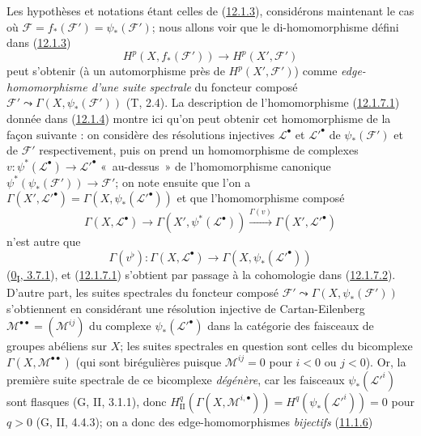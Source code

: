\begin{env}[12.1.7]
\label{0.12.1.7-fr}
Les hypothèses et notations étant celles de
(\hyperref[0.12.1.3-fr]{12.1.3}), considérons maintenant le cas où
$\mathcal F=f_*(\mathcal F')=\psi_*(\mathcal F')$; nous allons voir que le
di-homomorphisme défini dans (\hyperref[0.12.1.3-fr]{12.1.3})
\[
\label{0.12.1.7.1-fr}
\tag{12.1.7.1}
H^p(X,f_*(\mathcal F'))\longrightarrow H^p(X',\mathcal F')
\]
peut s'obtenir (à un automorphisme près de $H^p(X',\mathcal F')$) comme
\emph{edge-homomorphisme d'une suite spectrale} du foncteur composé
$\mathcal F'\leadsto\Gamma(X,\psi_*(\mathcal F'))$ (T, 2.4). La description
de l'homomorphisme (\hyperref[0.12.1.7.1-fr]{12.1.7.1}) donnée dans
(\hyperref[0.12.1.4-fr]{12.1.4}) montre ici qu'on peut obtenir cet
homomorphisme de la façon suivante : on considère des résolutions injectives
$\mathcal L^\bullet$ et $\mathcal L'^\bullet$ de $\psi_*(\mathcal F')$ et de
$\mathcal F'$ respectivement, puis on prend un homomorphisme de complexes
$v:\psi^*(\mathcal L^\bullet)\to\mathcal L'^\bullet$ «~au-dessus~» de
l'homomorphisme canonique $\psi^*(\psi_*(\mathcal F'))\to\mathcal F'$;
on note ensuite que l'on a
$\Gamma(X',\mathcal L'^\bullet)=\Gamma(X,\psi_*(\mathcal L'^\bullet))$ et
que l'homomorphisme composé
\[
\Gamma(X,\mathcal L^\bullet)\longrightarrow
\Gamma(X',\psi^*(\mathcal L^\bullet))
\xrightarrow{\Gamma(v)}\Gamma(X',\mathcal L'^\bullet)
\]
n'est autre que
\[
\label{0.12.1.7.2-fr}
\tag{12.1.7.2}
\Gamma(v^\flat):\Gamma(X,\mathcal L^\bullet)
\longrightarrow\Gamma(X,\psi_*(\mathcal L'^\bullet))
\]
(\hyperref[0.3.7.1-fr]{0\textsubscript{I}, 3.7.1}), et
(\hyperref[0.12.1.7.1-fr]{12.1.7.1}) s'obtient par passage à la cohomologie
dans (\hyperref[0.12.1.7.2-fr]{12.1.7.2}). D'autre part, les suites spectrales
du foncteur composé $\mathcal F'\leadsto\Gamma(X,\psi_*(\mathcal F'))$
s'obtiennent en considérant une résolution injective de Cartan-Eilenberg
$\mathcal M^{\bullet\bullet}=(\mathcal M^{ij})$ du complexe
$\psi_*(\mathcal L'^\bullet)$ dans la catégorie des faisceaux de groupes
abéliens sur $X$; les suites spectrales en question sont celles du bicomplexe
$\Gamma(X,\mathcal M^{\bullet\bullet})$ (qui sont birégulières puisque
$\mathcal M^{ij}=0$ pour $i<0$ ou $j<0$). Or, la première suite spectrale de
ce bicomplexe \emph{dégénère}, car les faisceaux
$\psi_*(\mathcal L'^i)$ sont flasques (G, II, 3.1.1), donc
$H_{\mathrm{II}}^q(\Gamma(X,\mathcal M^{i,\bullet}))
=H^q(\psi_*(\mathcal L'^i))=0$ pour $q>0$ (G, II, 4.4.3); on a donc des
edge-homomorphismes \emph{bijectifs} (\hyperref[0.11.1.6-fr]{11.1.6})

\end{env}

